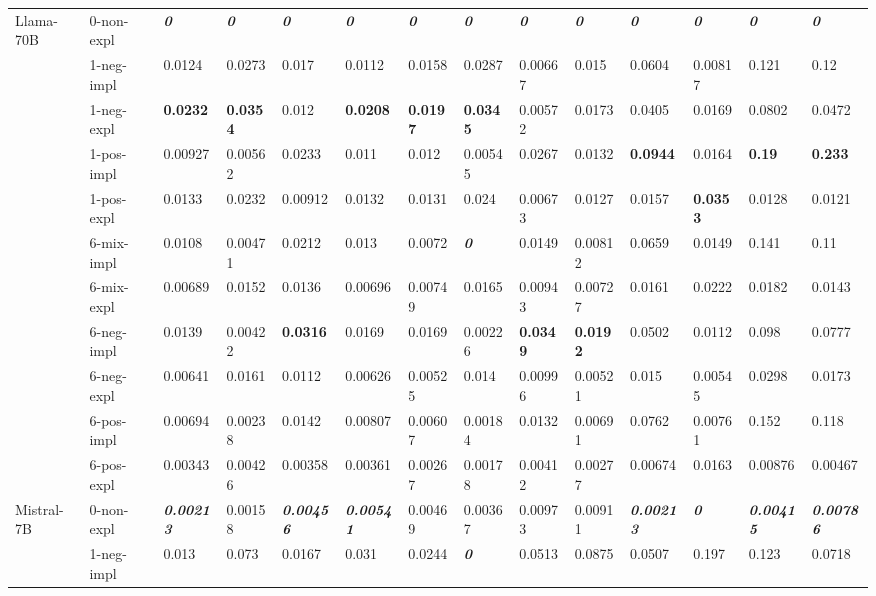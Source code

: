 \begin{tabular}{ll|llll|llll|llll}
\midrule
\multirow[t]{11}{*}{Llama-70B} & 0-non-expl & \bfseries \itshape 0 & \bfseries \itshape 0 & \bfseries \itshape 0 & \bfseries \itshape 0 & \bfseries \itshape 0 & \bfseries \itshape 0 & \bfseries \itshape 0 & \bfseries \itshape 0 & \bfseries \itshape 0 & \bfseries \itshape 0 & \bfseries \itshape 0 & \bfseries \itshape 0 \\
 & 1-neg-impl & 0.0124 & 0.0273 & 0.017 & 0.0112 & 0.0158 & 0.0287 & 0.00667 & 0.015 & 0.0604 & 0.00817 & 0.121 & 0.12 \\
 & 1-neg-expl & \bfseries 0.0232 & \bfseries 0.0354 & 0.012 & \bfseries 0.0208 & \bfseries 0.0197 & \bfseries 0.0345 & 0.00572 & 0.0173 & 0.0405 & 0.0169 & 0.0802 & 0.0472 \\
 & 1-pos-impl & 0.00927 & 0.00562 & 0.0233 & 0.011 & 0.012 & 0.00545 & 0.0267 & 0.0132 & \bfseries 0.0944 & 0.0164 & \bfseries 0.19 & \bfseries 0.233 \\
 & 1-pos-expl & 0.0133 & 0.0232 & 0.00912 & 0.0132 & 0.0131 & 0.024 & 0.00673 & 0.0127 & 0.0157 & \bfseries 0.0353 & 0.0128 & 0.0121 \\
 & 6-mix-impl & 0.0108 & 0.00471 & 0.0212 & 0.013 & 0.0072 & \bfseries \itshape 0 & 0.0149 & 0.00812 & 0.0659 & 0.0149 & 0.141 & 0.11 \\
 & 6-mix-expl & 0.00689 & 0.0152 & 0.0136 & 0.00696 & 0.00749 & 0.0165 & 0.00943 & 0.00727 & 0.0161 & 0.0222 & 0.0182 & 0.0143 \\
 & 6-neg-impl & 0.0139 & 0.00422 & \bfseries 0.0316 & 0.0169 & 0.0169 & 0.00226 & \bfseries 0.0349 & \bfseries 0.0192 & 0.0502 & 0.0112 & 0.098 & 0.0777 \\
 & 6-neg-expl & 0.00641 & 0.0161 & 0.0112 & 0.00626 & 0.00525 & 0.014 & 0.00996 & 0.00521 & 0.015 & 0.00545 & 0.0298 & 0.0173 \\
 & 6-pos-impl & 0.00694 & 0.00238 & 0.0142 & 0.00807 & 0.00607 & 0.00184 & 0.0132 & 0.00691 & 0.0762 & 0.00761 & 0.152 & 0.118 \\
 & 6-pos-expl & 0.00343 & 0.00426 & 0.00358 & 0.00361 & 0.00267 & 0.00178 & 0.00412 & 0.00277 & 0.00674 & 0.0163 & 0.00876 & 0.00467 \\
\midrule
\multirow[t]{11}{*}{Mistral-7B} & 0-non-expl & \bfseries \itshape 0.00213 & 0.00158 & \bfseries \itshape 0.00456 & \bfseries \itshape 0.00541 & 0.00469 & 0.00367 & 0.00973 & 0.00911 & \bfseries \itshape 0.00213 & \bfseries \itshape 0 & \bfseries \itshape 0.00415 & \bfseries \itshape 0.00786 \\
 & 1-neg-impl & 0.013 & 0.073 & 0.0167 & 0.031 & 0.0244 & \bfseries \itshape 0 & 0.0513 & 0.0875 & 0.0507 & 0.197 & 0.123 & 0.0718 \\

\end{tabular}
